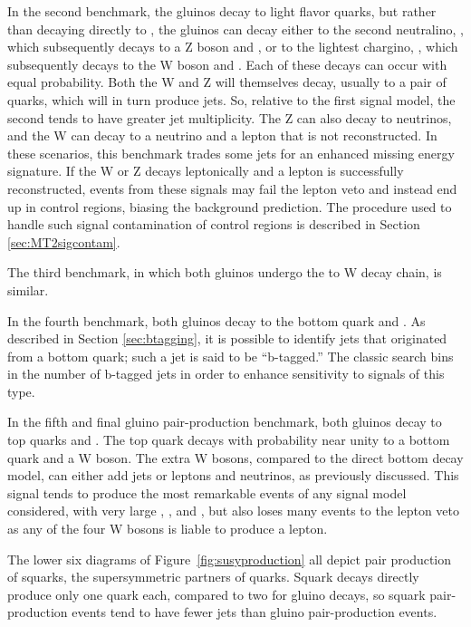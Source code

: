     In the second benchmark, the gluinos decay to light flavor quarks, but rather than decaying directly to \lsp, the gluinos can decay either to the second neutralino, \chitwo, which subsequently decays to a Z boson and \lsp, or to the lightest chargino, \chargino, which subsequently decays to the W boson and \lsp.
    Each of these decays can occur with equal probability.
    Both the W and Z will themselves decay, usually to a pair of quarks, which will in turn produce jets. 
    So, relative to the first signal model, the second tends to have greater jet multiplicity.
    The Z can also decay to neutrinos, and the W can decay to a neutrino and a lepton that is not reconstructed.
    In these scenarios, this benchmark trades some jets for an enhanced missing energy signature.
    If  the W or Z decays leptonically and a lepton is successfully reconstructed, events from these signals may fail the lepton veto and instead end up in control regions, biasing the background prediction.
    The procedure used to handle such signal contamination of control regions is described in Section \ref{sec:MT2sigcontam}.

    The third benchmark, in which both gluinos undergo the \chargino to W decay chain, is similar.

    In the fourth benchmark, both gluinos decay to the bottom quark and \lsp.
    As described in Section \ref{sec:btagging}, it is possible to identify jets that originated from a bottom quark; such a jet is said to be ``b-tagged.''
    The classic search bins in the number of b-tagged jets in order to enhance sensitivity to signals of this type.

    In the fifth and final gluino pair-production benchmark, both gluinos decay to top quarks and \lsp.
    The top quark decays with probability near unity to a bottom quark and a W boson.
    The extra W bosons, compared to the direct bottom decay model, can either add jets or leptons and neutrinos, as previously discussed.
    This signal tends to produce the most remarkable events of any signal model considered, with very large \Ht, \njet, and \nb, but also loses many events to the lepton veto as any of the four W bosons is liable to produce a lepton.

    The lower six diagrams of Figure~\ref{fig:susyproduction} all depict pair production of squarks, the supersymmetric partners of quarks.
    Squark decays directly produce only one quark each, compared to two for gluino decays, so squark pair-production events tend to have fewer jets than gluino pair-production events.

